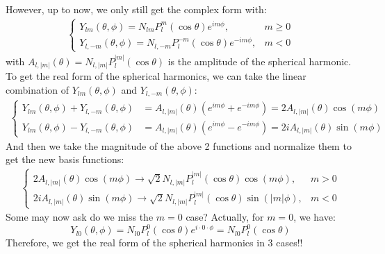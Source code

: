 \begin{foundation}
    However, up to now, we only still get the complex form with:
    \begin{align*}
        \begin{cases}
             Y_{lm}(\theta, \phi) = N_{lm} P_l^m(\cos \theta) e^{i m \phi}, & m \geq 0 \\
             Y_{l,-m}(\theta, \phi) = N_{l,-m} P_l^{-m}(\cos \theta) e^{-i m \phi}, & m < 0
        \end{cases}
    \end{align*}
    with $A_{l,|m|}(\theta) = N_{l,|m|} P_l^{|m|}(\cos \theta)$ is the amplitude of the spherical harmonic. \\

    To get the real form of the spherical harmonics, we can take the linear combination of $Y_{lm}(\theta, \phi)$ and $Y_{l,-m}(\theta, \phi)$:
    \begin{align*}
        \begin{cases}
            Y_{lm}(\theta, \phi) + Y_{l,-m}(\theta, \phi) &= A_{l,|m|}(\theta) \left(e^{i m \phi} + e^{-i m \phi} \right) = 2 A_{l,|m|}(\theta) \cos(m \phi) \\
            Y_{lm}(\theta, \phi) - Y_{l,-m}(\theta, \phi) &= A_{l,|m|}(\theta) \left(e^{i m \phi} - e^{-i m \phi} \right) = 2 i A_{l,|m|}(\theta) \sin(m \phi)
        \end{cases}
    \end{align*}
    And then we take the magnitude of the above 2 functions and normalize them to get the new basis functions:
    \begin{align*}
        \begin{cases}
            2 A_{l,|m|}(\theta) \cos(m \phi) \rightarrow \sqrt{2} N_{l,|m|} P_l^{|m|}(\cos \theta) \cos(m \phi), & m > 0 \\
            2 i A_{l,|m|}(\theta) \sin(m \phi) \rightarrow \sqrt{2} N_{l,|m|} P_l^{|m|}(\cos \theta) \sin(|m| \phi), & m < 0
        \end{cases}
    \end{align*}
    Some may now ask do we miss the $m = 0$ case? Actually, for $m = 0$, we have:
    \[
        Y_{l0}(\theta, \phi) = N_{l0} P_l^0(\cos \theta) e^{i \cdot 0 \cdot \phi} = N_{l0} P_l^0(\cos \theta)
    \]
    Therefore, we get the real form of the spherical harmonics in 3 cases!!
\end{foundation}

